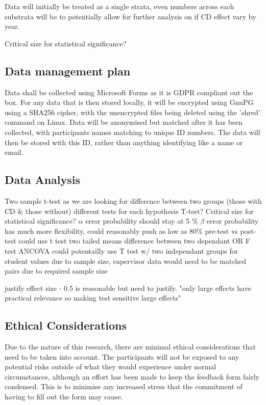 \documentclass[lettersize,journal]{IEEEtran}
\begin{document}
        Data will initially be treated as a single strata, even numbers across each substrata will be to potentially allow for further analysis on if CD effect vary by year.

        Critical size for statistical significance?
    
    \subsection{Data management plan}
        Data shall be collected using Microsoft Forms as it is GDPR compliant out the box. For any data that is then stored locally, it will be encrypted using GnuPG \cite{encryption} using a SHA256 cipher, with the unencrypted files being deleted using the 'shred' command on Linux.
        Data will be anonymised but matched after it has been collected, with participants names matching to unique ID numbers. The data will then be stored with this ID, rather than anything identifying like a name or email.
    
    \subsection{Data Analysis}
        Two sample t-test as we are looking for difference between two groups (those with CD \& those without)
        different tests for each hypothesis
        T-test? Critical size for statistical significance?
        $\alpha$ error probability should stay at 5 \%
        $\beta$ error probability has much more flexibility, could reasonably push as low as 80\%
        pre-test vs post-test could use t test two tailed means difference between two dependant OR F test ANCOVA
        could potentailly use T test w/ two independant groups for student values due to sample size, supervisor data would need to be matched pairs due to required sample size

        justify effect size - 0.5 is reasonable but need to justify. "only large effects have practical relevance so making test sensitive large effects"

    \subsection{Ethical Considerations}
        Due to the nature of this research, there are minimal ethical considerations that need to be taken into account. The participants will not be exposed to any potential risks outside of what they would experience under normal circumstances, although an effort has been made to keep the feedback form fairly condensed. This is to minimise any increased stress that the commitment of having to fill out the form may cause.
    
\end{document}
